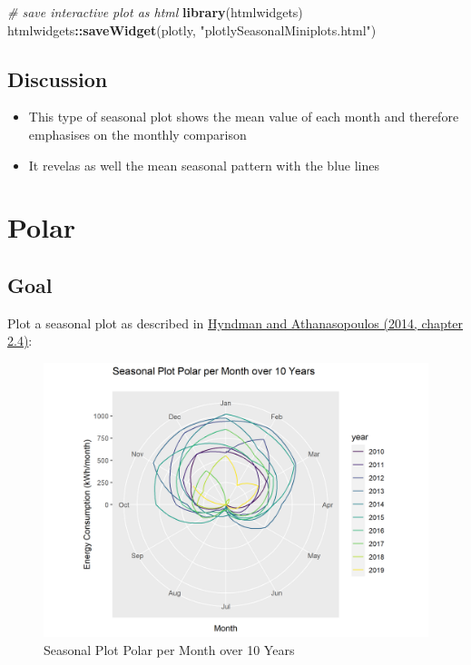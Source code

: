 \documentclass[
  a4paperpaper,
]{book}
\newenvironment{Shaded}{\begin{snugshade}}{\end{snugshade}}
\newcommand{\CommentTok}[1]{\textcolor[rgb]{0.56,0.35,0.01}{\textit{#1}}}
\newcommand{\KeywordTok}[1]{\textcolor[rgb]{0.13,0.29,0.53}{\textbf{#1}}}
\newcommand{\NormalTok}[1]{#1}
\newcommand{\OperatorTok}[1]{\textcolor[rgb]{0.81,0.36,0.00}{\textbf{#1}}}
\newcommand{\StringTok}[1]{\textcolor[rgb]{0.31,0.60,0.02}{#1}}
\let\oldShaded\Shaded
\let\endoldShaded\endShaded
\renewenvironment{Shaded}{\footnotesize\oldShaded}{\endoldShaded}
\begin{document}
\begin{Shaded}
\begin{Highlighting}[]
\CommentTok{# save interactive plot as html}
\KeywordTok{library}\NormalTok{(htmlwidgets)}
\NormalTok{htmlwidgets}\OperatorTok{::}\KeywordTok{saveWidget}\NormalTok{(plotly, }\StringTok{"plotlySeasonalMiniplots.html"}\NormalTok{)}
\end{Highlighting}
\end{Shaded}

\hypertarget{discussion-1}{%
\subsection{Discussion}\label{discussion-1}}

\begin{itemize}
\item
  This type of seasonal plot shows the mean value of each month and therefore emphasises on the monthly comparison
\item
  It revelas as well the mean seasonal pattern with the blue lines
\end{itemize}

\newpage

\hypertarget{polar}{%
\section{Polar}\label{polar}}

\hypertarget{goal-2}{%
\subsection{Goal}\label{goal-2}}

Plot a seasonal plot as described in \href{https://otexts.com/fpp2/seasonal-plots.html}{Hyndman and Athanasopoulos (2014, chapter 2.4)}:

\begin{figure}
\includegraphics[width=0.7\linewidth]{images/plotSeasonalPolar} \caption{Seasonal Plot Polar per Month over 10 Years}\label{fig:unnamed-chunk-10}
\end{figure}
\end{document}
